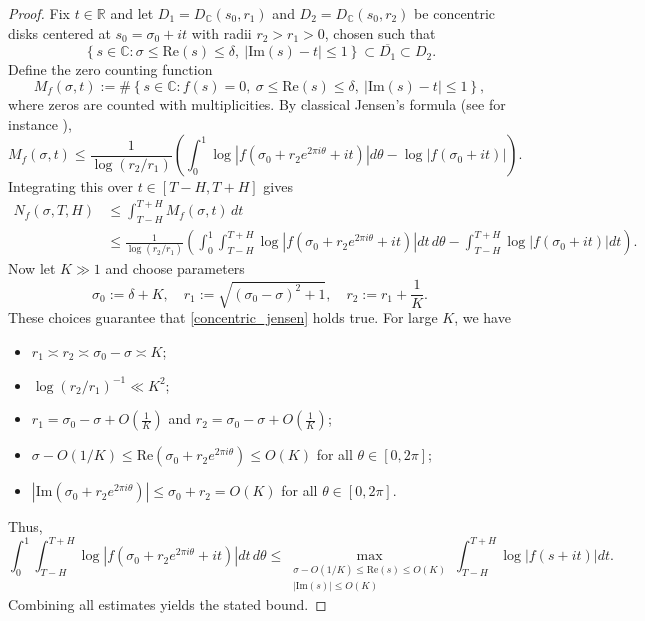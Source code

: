 \documentclass[12pt,letterpaper]{amsart}
\theoremstyle{plain}
\theoremstyle{definition}
\theoremstyle{remark}
\newcommand{\CC}{\mathbb{C}}
\begin{document}
\begin{proof}
Fix $t \in \mathbb{R}$ and let $D_1 = D_\CC(s_0, r_1)$ and $D_2 = D_\CC(s_0, r_2)$ be concentric disks centered at $s_0 = \sigma_0 + it$ with radii $r_2 > r_1 > 0$, chosen such that
\begin{equation}\label{concentric_jensen}
\left\{ s \in \CC : \sigma \le \mathrm{Re}(s) \le \delta,\ |\mathrm{Im}(s) - t| \le 1 \right\} \subset \overline{D_1} \subset D_2.
\end{equation}
Define the zero counting function
\[
M_f(\sigma, t) := \#\left\{ s \in \CC : f(s) = 0,\ \sigma \le \mathrm{Re}(s) \le \delta,\ |\mathrm{Im}(s) - t| \le 1 \right\},
\]
where zeros are counted with multiplicities. By classical Jensen's formula (see for instance \cite{Titchmarsh}),
\[
M_f(\sigma, t) \le \frac{1}{\log(r_2 / r_1)} \left( \int_0^1 \log |f(\sigma_0 + r_2 e^{2\pi i \theta} + it)| d\theta - \log |f(\sigma_0 + it)| \right).
\]
Integrating this over $t \in [T - H, T + H]$ gives
\begin{align*}
N_f(\sigma, T, H) &\le \int_{T - H}^{T + H} M_f(\sigma, t)\, dt \\
&\le \frac{1}{\log(r_2 / r_1)} \left( \int_0^1 \int_{T - H}^{T + H} \log |f(\sigma_0 + r_2 e^{2\pi i \theta} + it)| dt\, d\theta - \int_{T - H}^{T + H} \log |f(\sigma_0 + it)| dt \right).
\end{align*}
Now let $K\gg 1 $ and choose parameters
\[
\sigma_0 := \delta + K, \quad r_1 := \sqrt{(\sigma_0-\sigma)^2 + 1}, \quad r_2 := r_1 + \frac{1}{K}.
\]
These choices guarantee that \eqref{concentric_jensen} holds true. For large $K$, we have
\begin{itemize}
\item $r_1 \asymp r_2 \asymp \sigma_0 - \sigma \asymp K$;
\item $\log(r_2 / r_1)^{-1} \ll K^2$;
\item $r_1 = \sigma_0 - \sigma + O(\frac{1}{K}) $ and $r_2 = \sigma_0 - \sigma + O(\frac{1}{K}) $;
\item $\sigma - O(1/K) \le\mathrm{Re}(\sigma_0 + r_2 e^{2\pi i \theta}) \le O(K)$ for all $\theta\in [0,2\pi]$;
\item $|\mathrm{Im}(\sigma_0 + r_2 e^{2\pi i \theta})| \le \sigma_0 + r_2 = O(K)$ for all $\theta\in [0,2\pi]$.
\end{itemize}
Thus,
\[
\int_0^1 \int_{T - H}^{T + H} \log |f(\sigma_0 + r_2 e^{2\pi i \theta} + it)| dt\, d\theta
\le \max_{\substack{ \sigma - O(1/K) \le \mathrm{Re}(s) \le O(K) \\ |\mathrm{Im}(s)| \le O(K) }} \int_{T - H}^{T + H} \log |f(s + it)| dt.
\]
Combining all estimates yields the stated bound.
\end{proof}
\end{document}
